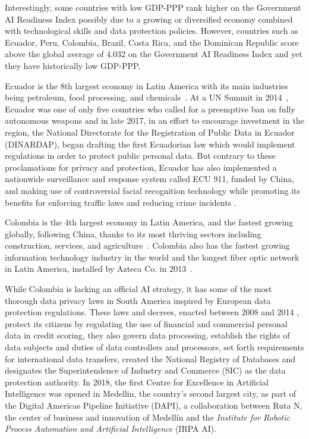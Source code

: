 \documentclass[conference]{IEEEtran}
\begin{document}
Interestingly, some countries with low GDP-PPP rank higher on the Government AI Readiness Index possibly due to a growing or diversified economy combined with technological skills and data protection policies. However, countries such as Ecuador, Peru, Colombia, Brazil, Costa Rica, and the Dominican Republic score above the global average of 4.032 on the Government AI Readiness Index and yet they have historically low GDP-PPP.

Ecuador is the 8th largest economy in Latin America with its main industries being petroleum, food processing, and chemicals~\cite{rivera2017synergies}. At a UN Summit in 2014~\cite{jeffries2014only}, Ecuador was one of only five countries who called for a preemptive ban on fully autonomous weapons and in late 2017, in an effort to encourage investment in the region, the National Directorate for the Registration of Public Data in Ecuador (DINARDAP), began drafting the first Ecuadorian law which would implement regulations in order to protect public personal data. But contrary to these proclamations for privacy and protection, Ecuador has also implemented a nationwide surveillance and response system called ECU 911, funded by China, and making use of controversial facial recognition technology while promoting its benefits for enforcing traffic laws and reducing crime incidents \cite{corral2018911}.

Colombia is the 4th largest economy in Latin America, and the fastest growing globally, following China, thanks to its most thriving sectors including construction, services, and agriculture~\cite{giraldo2019commodity}. Colombia also has the fastest growing information technology industry in the world and the longest fiber optic network in Latin America, installed by Azteca Co. in 2013~\cite{AZoOptics2013azteca}.

While Colombia is lacking an official AI strategy, it has some of the most thorough data privacy laws in South America inspired by European data protection regulations. These laws and decrees, enacted between 2008 and 2014 \cite{piper2016data}, protect its citizens by regulating the use of financial and commercial personal data in credit scoring, they also govern data processing, establish the rights of data subjects and duties of data controllers and processors, set forth requirements for international data transfers, created the National Registry of Databases and designates the Superintendence of Industry and Commerce (SIC) as the data protection authority. In 2018, the first Centre for Excellence in Artificial Intelligence was opened in Medellin, the country's second largest city, as part of the Digital Americas Pipeline Initiative (DAPI), a collaboration between Ruta N, the center of business and innovation of Medellín and the \emph{Institute for Robotic Process Automation and Artificial Intelligence} (IRPA AI).
\end{document}

